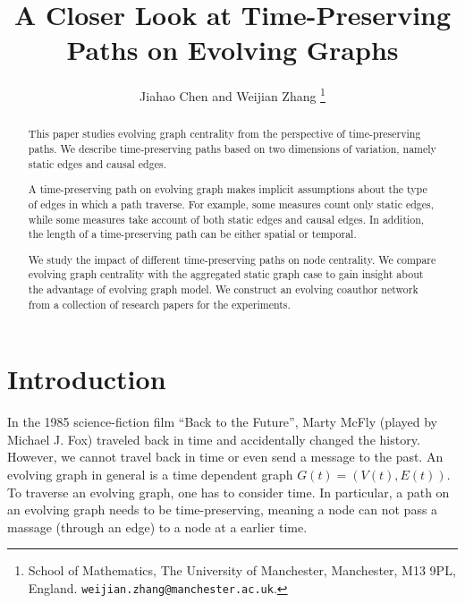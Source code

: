 \documentclass[12pt]{article}
\title{A Closer Look at Time-Preserving Paths on Evolving Graphs}
\author{Jiahao Chen and 
Weijian Zhang
\thanks{%
  School of Mathematics,
The University of Manchester,
                Manchester, M13 9PL, England.
\texttt{weijian.zhang@manchester.ac.uk}.
}
}
\theoremstyle{definition}
\begin{document}


\maketitle

\begin{abstract}
This paper studies evolving graph centrality from the perspective of time-preserving paths. We describe time-preserving paths based on two dimensions of variation, namely static edges and causal edges. 

A time-preserving path on evolving graph makes implicit assumptions about the type of edges in which a path traverse. For example, some measures count only static edges,
while some measures take account of both static edges and causal edges. In addition, the length of a time-preserving path can be either spatial or temporal. 

We study the impact of different time-preserving paths on node centrality. We compare evolving graph centrality with the aggregated static graph case to gain insight about the advantage of evolving graph model. We construct an evolving coauthor network from
a collection of research papers for the experiments.
\end{abstract}

\section{Introduction}
\label{sec:introduction}

In the 1985 science-fiction film ``Back to the Future'', Marty McFly (played by Michael J. Fox) traveled back in time and accidentally changed the history.
However, we cannot travel back in time or even send a message to the past.
An evolving graph in general is a time dependent graph $G(t) = (V(t), E(t))$.
To traverse an evolving graph, one has to consider time. In particular, a path on an evolving graph needs to be time-preserving, meaning a node can not pass a massage (through an edge) to a node at a earlier time.
\end{document}
